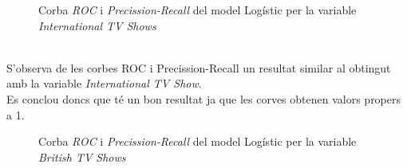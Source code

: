 \documentclass[a4paper, 11pt]{article}
\begin{document}
\begin{figure}[h]
\centering
    \caption{Corba \textit{ROC} i \textit{Precission-Recall} del model Logístic per la variable \textit{International TV Shows}}
    \label{fig:my_label}
\end{figure}\\
S'observa de les corbes ROC i Precission-Recall un resultat similar al obtingut amb la variable \textit{International TV Show}.\\
Es conclou doncs que té un bon resultat ja que les corves obtenen valors propers a 1.
\newpage
\begin{figure}[h]
\centering
    \caption{Corba \textit{ROC} i \textit{Precission-Recall} del model Logístic per la variable \textit{British TV Shows}}
    \label{fig:my_label}
\end{figure}
\end{document}
